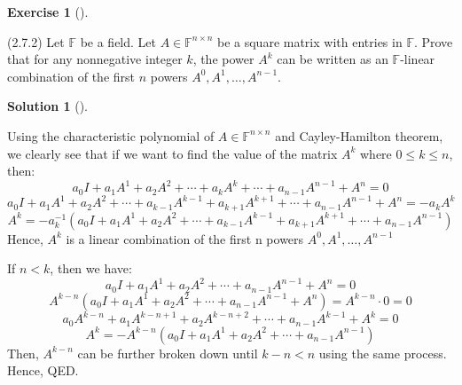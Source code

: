 \documentclass[numbers=enddot,12pt,final,onecolumn,notitlepage]{scrartcl}
\newcounter{exer}
\newcounter{sol}
\theoremstyle{definition}
\newtheorem{exmp}[exer]{Exercise}
\newenvironment{exercise}[1][]
{\begin{exmp}[#1]\begin{leftbar}}
        {\end{leftbar}\end{exmp}}
\newtheorem{solu}[sol]{Solution}
\newenvironment{solution}[1][]
{\begin{solu}[#1]\begin{leftbar}}
        {\end{leftbar}\end{solu}}
\begin{document}
\begin{exercise}
	\label{exe.schurtri.ch.powers-span} (2.7.2) Let $\mathbb{F}$ be a field. Let
	$A\in\mathbb{F}^{n\times n}$ be a square matrix with entries in $\mathbb{F}$.
	Prove that for any nonnegative integer $k$, the power $A^{k}$ can be written
	as an $\mathbb{F}$-linear combination of the first $n$ powers $A^{0},A^{1},\ldots,A^{n-1}$.
\end{exercise}

\begin{solution}
	Using the characteristic polynomial of $A \in \mathbb{F}^{n \times n}$ and Cayley-Hamilton theorem, we clearly see that if we want to find the value of the matrix $A^k$ where $0 \le k \le n$, then:
	\[
		a_0I + a_1A^1 + a_2A^2 + \cdots + a_kA^k + \cdots + a_{n-1}A^{n-1} + A^n = 0
	\]
	\[
		a_0I + a_1A^1 + a_2A^2 + \cdots + a_{k-1}A^{k-1} + a_{k+1}A^{k+1} + \cdots + a_{n-1}A^{n-1} + A^n = -a_kA^k
	\]
	\[
		A^k = -a_k^{-1}(a_0I + a_1A^1 + a_2A^2 + \cdots + a_{k-1}A^{k-1} + a_{k+1}A^{k+1} + \cdots + a_{n-1}A^{n-1})
	\]
	Hence, $A^k$ is a linear combination of the first n powers $A^{0},A^{1},\ldots,A^{n-1}$

	If $n < k$, then we have:
	\[
		a_0I + a_1A^1 + a_2A^2 + \cdots + a_{n-1}A^{n-1} + A^n = 0
	\]
	\[
		A^{k-n}(a_0I + a_1A^1 + a_2A^2 + \cdots + a_{n-1}A^{n-1} + A^n) = A^{k-n} \cdot 0 = 0
	\]
	\[
		a_0A^{k-n} + a_1A^{k-n+1} + a_2A^{k-n+2} + \cdots + a_{n-1}A^{k-1} + A^{k} = 0
	\]
	\[
		A^{k} = -A^{k-n}(a_0I + a_1A^1 + a_2A^2 + \cdots + a_{n-1}A^{n-1})
	\]
	Then, $A^{k-n}$ can be further broken down until $k - n < n$ using the same process.
	Hence, QED.

\end{solution}
\end{document}
